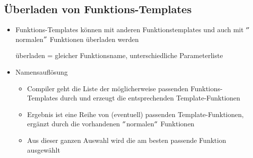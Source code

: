 \subsection{Überladen von Funktions-Templates}
\begin{itemize}
	\item Funktions-Templates können mit anderen Funktionstemplates und auch mit $"$normalen$"$ Funktionen überladen werden
	\begin{hinweis}
	überladen = gleicher Funktionsname, unterschiedliche Parameterliste
	\end{hinweis}
	\item Namensauflösung
	\begin{itemize}
		\item Compiler geht die Liste der möglicherweise passenden Funktions-Templates durch und erzeugt die entsprechenden Template-Funktionen
		\item Ergebnis ist eine Reihe von (eventuell) passenden Template-Funktionen, ergänzt durch die vorhandenen $"$normalen$"$ Funktionen
		\item Aus dieser ganzen Auswahl wird die am besten passende Funktion ausgewählt
	\end{itemize}
\end{itemize}

